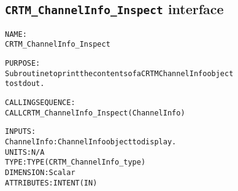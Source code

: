 \subsection{\texttt{CRTM\_ChannelInfo\_Inspect} interface}
  \label{sec:CRTM_ChannelInfo_Inspect_interface}
  \begin{alltt}
 
  NAME:
        CRTM_ChannelInfo_Inspect
 
  PURPOSE:
        Subroutine to print the contents of a CRTM ChannelInfo object
        to stdout.
 
  CALLING SEQUENCE:
        CALL CRTM_ChannelInfo_Inspect( ChannelInfo )
 
  INPUTS:
        ChannelInfo:   ChannelInfo object to display.
                       UNITS:      N/A
                       TYPE:       TYPE(CRTM_ChannelInfo_type)
                       DIMENSION:  Scalar
                       ATTRIBUTES: INTENT(IN)
 
  \end{alltt}
